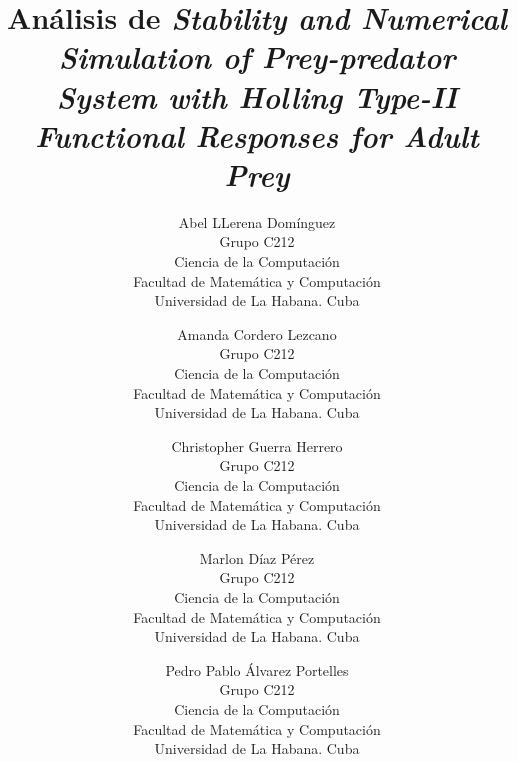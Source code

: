 \documentclass{wscpaperproc}
\theoremstyle{wsc}
\begin{document}
%
%

\title{Análisis de {\it Stability and Numerical Simulation of Prey-predator System with Holling
Type-II Functional Responses for Adult Prey}}

\author{Abel LLerena Domínguez\\[12pt]
	Grupo C212\\
	Ciencia de la Computación\\
	Facultad de Matemática y Computación\\
	Universidad de La Habana. Cuba\\
	\and
	Amanda Cordero Lezcano\\[12pt]
	Grupo C212\\
	Ciencia de la Computación\\
	Facultad de Matemática y Computación\\
	Universidad de La Habana. Cuba\\
	\and
	Christopher Guerra Herrero\\[12pt]
	Grupo C212\\
	Ciencia de la Computación\\
	Facultad de Matemática y Computación\\
	Universidad de La Habana. Cuba\\
	\and
	Marlon Díaz Pérez\\[12pt]
	Grupo C212\\
	Ciencia de la Computación\\
	Facultad de Matemática y Computación\\
	Universidad de La Habana. Cuba\\
	\and
	Pedro Pablo Álvarez Portelles\\[12pt]
	Grupo C212\\
	Ciencia de la Computación\\
	Facultad de Matemática y Computación\\
	Universidad de La Habana. Cuba\\
}
\end{document}
